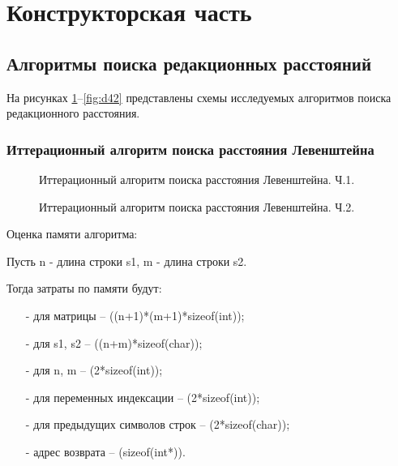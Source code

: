 \section{Конструкторская часть}
\subsection{Алгоритмы поиска редакционных расстояний}
На рисунках \ref{fig:d11}--\ref{fig:d42} представлены схемы исследуемых алгоритмов поиска редакционного расстояния.
\subsubsection{Иттерационный алгоритм поиска расстояния Левенштейна}
\begin{figure}[!h]
	\centering
	\captionsetup{justification=centering}
    \def\svgscale{0.75}
	
	\caption{Иттерационный алгоритм поиска расстояния Левенштейна. Ч.1.}
	\label{fig:d11}
\end{figure}
\begin{figure}[!h]
	\centering
	\captionsetup{justification=centering}
    \def\svgscale{0.8}
	
	\caption{Иттерационный алгоритм поиска расстояния Левенштейна. Ч.2.}
	\label{fig:d12}
\end{figure}
\pagebreak

Оценка памяти алгоритма:\par
Пусть n - длина строки s1, m - длина строки s2.\par
Тогда затраты по памяти будут:\par
\begin{itemize}
	\item[-] для матрицы -- ((n+1)*(m+1)*sizeof(int));
	\item[-] для s1, s2 -- ((n+m)*sizeof(char));
	\item[-] для n, m -- (2*sizeof(int));
	\item[-] для переменных индексации -- (2*sizeof(int));
	\item[-] для предыдущих символов строк -- (2*sizeof(char));
	\item[-] адрес возврата -- (sizeof(int*)).
\end{itemize}
\pagebreak

